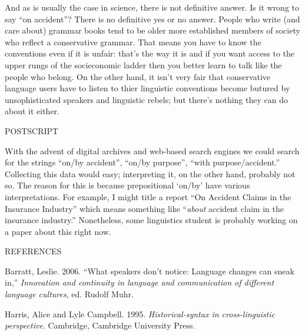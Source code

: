 \documentclass{wpblogentry}
\begin{document}
And as is usually the case in science, there is not definitive answer. Is it wrong to say ``on accident''? There is no definitive yes or no answer. People who write (and care about) grammar books tend to be older more established members of society who reflect a conservative grammar. That means you have to know the conventions even if it is unfair: that's the way it is and if you want access to the upper rungs of the socieconomic ladder then you better learn to talk like the people who belong. On the other hand, it isn't very fair that conservative language users have to listen to thier linguistic conventions become butured by unsophisticated speakers and linguistic rebels; but there's nothing they can do about it either. 


POSTSCRIPT

With the advent of digital archives and web-based search engines we could search for the strings ``on/by accident'', ``on/by purpose'', ``with purpose/accident.'' Collecting this data would easy; interpreting it, on the other hand, probably not so. The reason for this is because prepositional `on/by' have various interpretations. For example, I might title a report ``On Accident Claims in the Insurance Industry'' which means something like ``\emph{about} accident claim in the insurance industry.'' Nonetheless, some linguistics student is probably working on a paper about this right now. 


REFERENCES

Barratt, Leslie. 2006. ``What speakers don't notice: Language changes can sneak in,'' \emph{Innovation and continuity in language and communication of different language cultures}, ed. Rudolf Muhr.

Harris, Alice and Lyle Campbell. 1995. \emph{Historical-syntax in cross-linguistic perspective}. Cambridge, Cambridge University Press.  
\end{document}
